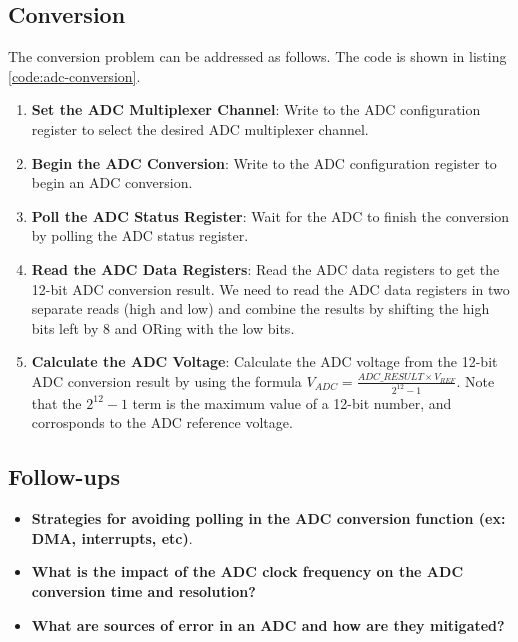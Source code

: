 \documentclass[main.tex]{subfiles}
\begin{document}


\subsection{Conversion}
The conversion problem can be addressed as follows. The code is shown in listing \ref{code:adc-conversion}.
\begin{enumerate}
    \item \textbf{Set the ADC Multiplexer Channel}: Write to the ADC configuration register to select the desired ADC multiplexer channel.
    \item \textbf{Begin the ADC Conversion}: Write to the ADC configuration register to begin an ADC conversion.
    \item \textbf{Poll the ADC Status Register}: Wait for the ADC to finish the conversion by polling the ADC status register.
    \item \textbf{Read the ADC Data Registers}: Read the ADC data registers to get the 12-bit ADC conversion result. We need to read the ADC data registers in two separate reads (high and low) and combine the results by shifting the high bits left by 8 and ORing with the low bits.
    \item \textbf{Calculate the ADC Voltage}: Calculate the ADC voltage from the 12-bit ADC conversion result by using the formula $V_{ADC} = \frac{ADC\_RESULT \times V_{REF}}{2^{12} - 1}$. Note that the $2^{12} - 1$ term is the maximum value of a 12-bit number, and corrosponds to the ADC reference voltage.
\end{enumerate}



\subsection{Follow-ups}
\begin{itemize}
    \item \textbf{Strategies for avoiding polling in the ADC conversion function (ex: DMA, interrupts, etc)}.
    \item \textbf{What is the impact of the ADC clock frequency on the ADC conversion time and resolution?}
    \item \textbf{What are sources of error in an ADC and how are they mitigated?}
\end{itemize}
\end{document}
